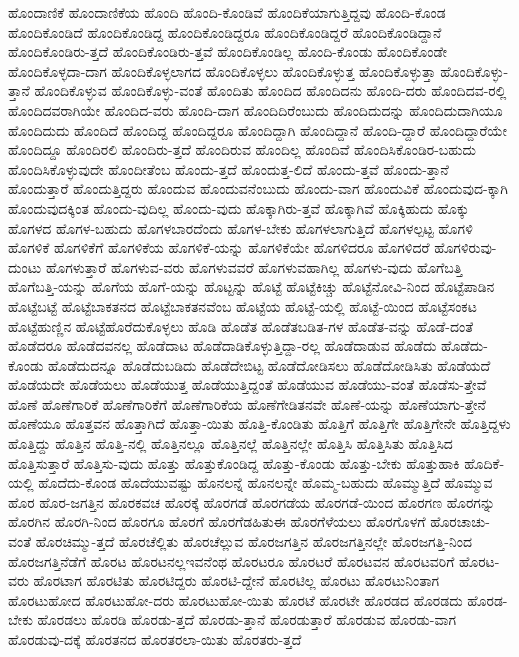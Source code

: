 {ಹೊಂದಾಣಿಕೆ
ಹೊಂದಾಣಿಕೆಯ
ಹೊಂದಿ
ಹೊಂದಿ-ಕೊಂಡಿವೆ
ಹೊಂದಿಕೆಯಾಗುತ್ತಿದ್ದವು
ಹೊಂದಿ-ಕೊಂಡ
ಹೊಂದಿಕೊಂಡಿದೆ
ಹೊಂದಿಕೊಂಡಿದ್ದ
ಹೊಂದಿಕೊಂಡಿದ್ದರೂ
ಹೊಂದಿಕೊಂಡಿದ್ದರೆ
ಹೊಂದಿಕೊಂಡಿದ್ದಾನೆ
ಹೊಂದಿಕೊಂಡಿರು-ತ್ತದೆ
ಹೊಂದಿಕೊಂಡಿರು-ತ್ತವೆ
ಹೊಂದಿಕೊಂಡಿಲ್ಲ
ಹೊಂದಿ-ಕೊಂಡು
ಹೊಂದಿಕೊಂಡೇ
ಹೊಂದಿಕೊಳ್ಳದಾ-ದಾಗ
ಹೊಂದಿಕೊಳ್ಳಲಾಗದ
ಹೊಂದಿಕೊಳ್ಳಲು
ಹೊಂದಿಕೊಳ್ಳುತ್ತ
ಹೊಂದಿಕೊಳ್ಳುತ್ತಾ
ಹೊಂದಿಕೊಳ್ಳು-ತ್ತಾನೆ
ಹೊಂದಿಕೊಳ್ಳುವ
ಹೊಂದಿಕೊಳ್ಳು-ವಂತೆ
ಹೊಂದಿತು
ಹೊಂದಿದ
ಹೊಂದಿದನು
ಹೊಂದಿ-ದರು
ಹೊಂದಿದವ-ರಲ್ಲಿ
ಹೊಂದಿದವರಾಗಿಯೇ
ಹೊಂದಿದ-ವರು
ಹೊಂದಿ-ದಾಗ
ಹೊಂದಿದಿರೆಂಬುದು
ಹೊಂದಿದುದನ್ನು
ಹೊಂದಿದುದಾಗಿಯೂ
ಹೊಂದಿದುದು
ಹೊಂದಿದೆ
ಹೊಂದಿದ್ದ
ಹೊಂದಿದ್ದರೂ
ಹೊಂದಿದ್ದಾಗಿ
ಹೊಂದಿದ್ದಾನೆ
ಹೊಂದಿ-ದ್ದಾರೆ
ಹೊಂದಿದ್ದಾರೆಯೇ
ಹೊಂದಿದ್ದೂ
ಹೊಂದಿರಲಿ
ಹೊಂದಿರು-ತ್ತದೆ
ಹೊಂದಿರುವ
ಹೊಂದಿಲ್ಲ
ಹೊಂದಿವೆ
ಹೊಂದಿಸಿಕೊಂಡಿರ-ಬಹುದು
ಹೊಂದಿಸಿಕೊಳ್ಳುವುದೇ
ಹೊಂದೀತೆಂಬ
ಹೊಂದು-ತ್ತದೆ
ಹೊಂದುತ್ತ-ಲಿದೆ
ಹೊಂದು-ತ್ತವೆ
ಹೊಂದು-ತ್ತಾನೆ
ಹೊಂದುತ್ತಾರೆ
ಹೊಂದುತ್ತಿದ್ದರು
ಹೊಂದುವ
ಹೊಂದುವನೆಂಬುದು
ಹೊಂದು-ವಾಗ
ಹೊಂದುವಿಕೆ
ಹೊಂದುವುದ-ಕ್ಕಾಗಿ
ಹೊಂದುವುದಕ್ಕಿಂತ
ಹೊಂದು-ವುದಿಲ್ಲ
ಹೊಂದು-ವುದು
ಹೊಕ್ಕಾಗಿರು-ತ್ತವೆ
ಹೊಕ್ಕಾಗಿವೆ
ಹೊಕ್ಕಿಹುದು
ಹೊಕ್ಕು
ಹೊಗಳದ
ಹೊಗಳ-ಬಹುದು
ಹೊಗಳಬಾರದೆಂದು
ಹೊಗಳ-ಬೇಕು
ಹೊಗಳಲಾಗುತ್ತಿದೆ
ಹೊಗಳಲ್ಪಟ್ಟ
ಹೊಗಳಿ
ಹೊಗಳಿಕೆ
ಹೊಗಳಿಕೆಗೆ
ಹೊಗಳಿಕೆಯ
ಹೊಗಳಿಕೆ-ಯನ್ನು
ಹೊಗಳಿಕೆಯೇ
ಹೊಗಳಿದರೂ
ಹೊಗಳಿದರೆ
ಹೊಗಳಿರುವು-ದುಂಟು
ಹೊಗಳುತ್ತಾರೆ
ಹೊಗಳುವ-ವರು
ಹೊಗಳುವವರೆ
ಹೊಗಳುವಹಾಗಿಲ್ಲ
ಹೊಗಳು-ವುದು
ಹೊಗೆಬತ್ತಿ
ಹೊಗೆಬತ್ತಿ-ಯನ್ನು
ಹೊಗೆಯ
ಹೊಗೆ-ಯನ್ನು
ಹೊಟ್ಟನ್ನು
ಹೊಟ್ಟೆ
ಹೊಟ್ಟೆಕಿಚ್ಚು
ಹೊಟ್ಟೆನೋವಿ-ನಿಂದ
ಹೊಟ್ಟೆಪಾಡಿನ
ಹೊಟ್ಟೆಬಟ್ಟೆ
ಹೊಟ್ಟೆಬಾಕತನದ
ಹೊಟ್ಟೆಬಾಕತನವೆಂಬ
ಹೊಟ್ಟೆಯ
ಹೊಟ್ಟೆ-ಯಲ್ಲಿ
ಹೊಟ್ಟೆ-ಯಿಂದ
ಹೊಟ್ಟೆಸಂಕಟ
ಹೊಟ್ಟೆಹುಣ್ಣಿನ
ಹೊಟ್ಟೆಹೊರೆದುಕೊಳ್ಳಲು
ಹೊಡಿ
ಹೊಡೆತ
ಹೊಡೆತಬಡಿತ-ಗಳ
ಹೊಡೆತ-ವನ್ನು
ಹೊಡೆ-ದಂತೆ
ಹೊಡೆದರೂ
ಹೊಡೆದವನಲ್ಲ
ಹೊಡೆದಾಟ
ಹೊಡೆದಾಡಿಕೊಳ್ಳುತ್ತಿದ್ದಾ-ರಲ್ಲ
ಹೊಡೆದಾಡುವ
ಹೊಡೆದು
ಹೊಡೆದು-ಕೊಂಡು
ಹೊಡೆದುದನ್ನೂ
ಹೊಡೆದುಬಡಿದು
ಹೊಡೆದೇಬಿಟ್ಟ
ಹೊಡೆದೋಡಿಸಲು
ಹೊಡೆದೋಡಿಸಿತು
ಹೊಡೆಯದೆ
ಹೊಡೆಯದೇ
ಹೊಡೆಯಲು
ಹೊಡೆಯುತ್ತ
ಹೊಡೆಯುತ್ತಿದ್ದಂತೆ
ಹೊಡೆಯುವ
ಹೊಡೆಯು-ವಂತೆ
ಹೊಡೆಸು-ತ್ತೇವೆ
ಹೊಣೆ
ಹೊಣೆಗಾರಿಕೆ
ಹೊಣೆಗಾರಿಕೆಗೆ
ಹೊಣೆಗಾರಿಕೆಯ
ಹೊಣೆಗೇಡಿತನವೇ
ಹೊಣೆ-ಯನ್ನು
ಹೊಣೆಯಾಗು-ತ್ತೇನೆ
ಹೊಣೆಯೂ
ಹೊತ್ತವನ
ಹೊತ್ತಾಗಿದೆ
ಹೊತ್ತಾ-ಯಿತು
ಹೊತ್ತಿ-ಕೊಂಡಿತು
ಹೊತ್ತಿಗೆ
ಹೊತ್ತಿಗೇ
ಹೊತ್ತಿಗೇನೇ
ಹೊತ್ತಿದ್ದಳು
ಹೊತ್ತಿದ್ದು
ಹೊತ್ತಿನ
ಹೊತ್ತಿ-ನಲ್ಲಿ
ಹೊತ್ತಿನಲ್ಲೂ
ಹೊತ್ತಿನಲ್ಲೆ
ಹೊತ್ತಿನಲ್ಲೇ
ಹೊತ್ತಿಸಿ
ಹೊತ್ತಿಸಿತು
ಹೊತ್ತಿಸಿದ
ಹೊತ್ತಿಸುತ್ತಾರೆ
ಹೊತ್ತಿಸು-ವುದು
ಹೊತ್ತು
ಹೊತ್ತುಕೊಂಡಿದ್ದ
ಹೊತ್ತು-ಕೊಂಡು
ಹೊತ್ತು-ಬೇಕು
ಹೊತ್ತುಹಾಕಿ
ಹೊದಿಕೆ-ಯಲ್ಲಿ
ಹೊದೆದು-ಕೊಂಡ
ಹೊದೆಯುವಷ್ಟು
ಹೊನಲನ್ನೆ
ಹೊನಲನ್ನೇ
ಹೊಮ್ಮ-ಬಹುದು
ಹೊಮ್ಮುತ್ತಿದೆ
ಹೊಮ್ಮುವ
ಹೊರ
ಹೊರ-ಜಗತ್ತಿನ
ಹೊರಕವಚ
ಹೊರಕ್ಕೆ
ಹೊರಗಡೆ
ಹೊರಗಡೆಯ
ಹೊರಗಡೆ-ಯಿಂದ
ಹೊರಗಣ
ಹೊರಗನ್ನು
ಹೊರಗಿನ
ಹೊರಗಿ-ನಿಂದ
ಹೊರಗೂ
ಹೊರಗೆ
ಹೊರಗೆಡಹಿತುಈ
ಹೊರಗೆಳೆಯಲು
ಹೊರಗೊಳಗೆ
ಹೊರಚಾಚು-ವಂತೆ
ಹೊರಚಿಮ್ಮು-ತ್ತದೆ
ಹೊರಚೆಲ್ಲಿತು
ಹೊರಚೆಲ್ಲುವ
ಹೊರಜಗತ್ತಿನ
ಹೊರಜಗತ್ತಿನಲ್ಲೇ
ಹೊರಜಗತ್ತಿ-ನಿಂದ
ಹೊರಜಗತ್ತಿನೆಡೆಗೆ
ಹೊರಟ
ಹೊರಟನಲ್ಲಇವನೆಂಥ
ಹೊರಟರೂ
ಹೊರಟರೆ
ಹೊರಟವನ
ಹೊರಟವರಿಗೆ
ಹೊರಟ-ವರು
ಹೊರಟಾಗ
ಹೊರಟಿತು
ಹೊರಟಿದ್ದರು
ಹೊರಟಿ-ದ್ದೇನೆ
ಹೊರಟಿಲ್ಲ
ಹೊರಟು
ಹೊರಟುನಿಂತಾಗ
ಹೊರಟುಹೋದ
ಹೊರಟುಹೋ-ದರು
ಹೊರಟುಹೋ-ಯಿತು
ಹೊರಟೆ
ಹೊರಟೇ
ಹೊರಡದ
ಹೊರಡದು
ಹೊರಡ-ಬೇಕು
ಹೊರಡಲು
ಹೊರಡಿ
ಹೊರಡು-ತ್ತದೆ
ಹೊರಡು-ತ್ತಾನೆ
ಹೊರಡುತ್ತಾರೆ
ಹೊರಡುವ
ಹೊರಡು-ವಾಗ
ಹೊರಡುವು-ದಕ್ಕೆ
ಹೊರತನದ
ಹೊರತರಲಾ-ಯಿತು
ಹೊರತರು-ತ್ತದೆ
}
